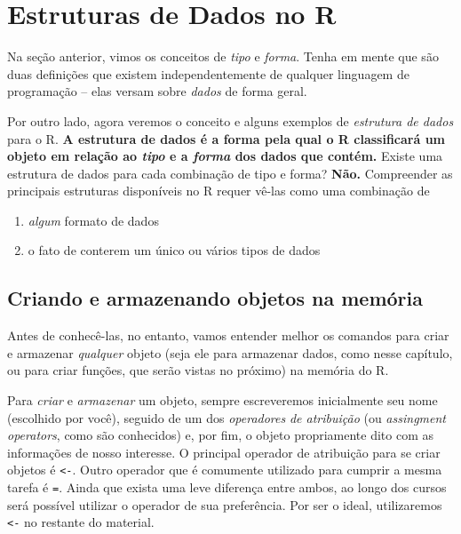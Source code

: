 \documentclass[
  letterpaper,
  DIV=11,
  numbers=noendperiod]{scrreprt}
\providecommand{\tightlist}{%
  \setlength{\itemsep}{0pt}\setlength{\parskip}{0pt}}\usepackage{longtable,booktabs,array}
\begin{document}
\section{Estruturas de Dados no R}\label{estruturas-de-dados-no-r}

Na seção anterior, vimos os conceitos de \emph{tipo} e \emph{forma}.
Tenha em mente que são duas definições que existem independentemente de
qualquer linguagem de programação -- elas versam sobre \emph{dados} de
forma geral.

Por outro lado, agora veremos o conceito e alguns exemplos de
\emph{estrutura de dados} para o R. \textbf{A estrutura de dados é a
forma pela qual o R classificará um objeto em relação ao \emph{tipo} e a
\emph{forma} dos dados que contém.} Existe uma estrutura de dados para
cada combinação de tipo e forma? \textbf{Não.} Compreender as principais
estruturas disponíveis no R requer vê-las como uma combinação de

\begin{enumerate}
\def\labelenumi{(\alph{enumi})}
\tightlist
\item
  \emph{algum} formato de dados
\item
  o fato de conterem um único ou vários tipos de dados
\end{enumerate}

\subsection{Criando e armazenando objetos na
memória}\label{criando-e-armazenando-objetos-na-memuxf3ria}

Antes de conhecê-las, no entanto, vamos entender melhor os comandos para
criar e armazenar \emph{qualquer} objeto (seja ele para armazenar dados,
como nesse capítulo, ou para criar funções, que serão vistas no próximo)
na memória do R.

Para \emph{criar} e \emph{armazenar} um objeto, sempre escreveremos
inicialmente seu nome (escolhido por você), seguido de um dos
\emph{operadores} \emph{de atribuição} (ou \emph{assingment operators},
como são conhecidos) e, por fim, o objeto propriamente dito com as
informações de nosso interesse. O principal operador de atribuição para
se criar objetos é \texttt{\textless{}-}. Outro operador que é comumente
utilizado para cumprir a mesma tarefa é \texttt{=}. Ainda que exista uma
leve diferença entre ambos, ao longo dos cursos será possível utilizar o
operador de sua preferência. Por ser o ideal, utilizaremos
\texttt{\textless{}-} no restante do material.
\end{document}
